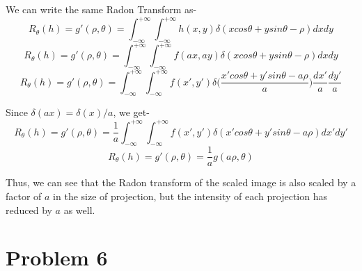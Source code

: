 \documentclass[a4paper,11pt]{article}
\numberwithin{definition}{section}
\numberwithin{mytheorem}{subsection}
\begin{document}
We can write the same Radon Transform as-
$$ R_\theta(h) =g'(\rho, \theta)= \int_{-\infty}^{+\infty}\int_{-\infty}^{+\infty}h(x,y)\delta(xcos\theta+ysin\theta -\rho)dxdy $$
$$ R_\theta(h) =g'(\rho, \theta)= \int_{-\infty}^{+\infty}\int_{-\infty}^{+\infty}f(ax,ay)\delta(xcos\theta+ysin\theta -\rho)dxdy $$
$$ R_\theta(h) =g'(\rho, \theta)= \int_{-\infty}^{+\infty}\int_{-\infty}^{+\infty}f(x',y')\delta\bigg(\frac{x'cos\theta+y'sin\theta -a\rho}{a}\bigg)\frac{dx'}{a}\frac{dy'}{a} $$

Since $\delta(ax) = \delta(x)/a$, we get-
$$ R_\theta(h) =g'(\rho, \theta)= \frac{1}{a}\int_{-\infty}^{+\infty}\int_{-\infty}^{+\infty}f(x',y')\delta(x'cos\theta+y'sin\theta -a\rho)dx'dy' $$
$$ R_\theta(h) =g'(\rho, \theta)= \frac{1}{a}g(a\rho, \theta) $$

Thus, we can see that the Radon transform of the scaled image is also scaled by a factor of $a$ in the size of projection, but the intensity of each projection has reduced by $a$ as well.
 








\section{Problem 6}
\end{document}
